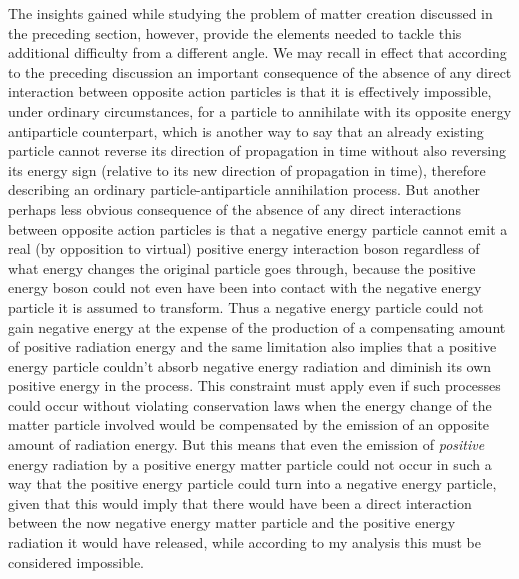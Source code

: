 \documentclass[notitlepage,12pt]{report}
\begin{document}
The insights gained while studying the problem of matter creation discussed in the preceding section, however, provide the elements needed to tackle this additional difficulty from a different angle. We may recall in effect that according to the preceding discussion an important consequence of the absence of any direct interaction between opposite action particles is that it is effectively impossible, under ordinary circumstances, for a particle to annihilate with its opposite energy antiparticle counterpart, which is another way to say that an already existing particle cannot reverse its direction of propagation in time without also reversing its energy sign (relative to its new direction of propagation in time), therefore describing an ordinary particle-antiparticle annihilation process. But another perhaps less obvious consequence of the absence of any direct interactions between opposite action particles is that a negative energy particle cannot emit a real (by opposition to virtual) positive energy interaction boson regardless of what energy changes the original particle goes through, because the positive energy boson could not even have been into contact with the negative energy particle it is assumed to transform. Thus a negative energy particle could not gain negative energy at the expense of the production of a compensating amount of positive radiation energy and the same limitation also implies that a positive energy particle couldn't absorb negative energy radiation and diminish its own positive energy in the process. This constraint must apply even if such processes could occur without violating conservation laws when the energy change of the matter particle involved would be compensated by the emission of an opposite amount of radiation energy. But this means that even the emission of \textit{positive} energy radiation by a positive energy matter particle could not occur in such a way that the positive energy particle could turn into a negative energy particle, given that this would imply that there would have been a direct interaction between the now negative energy matter particle and the positive energy radiation it would have released, while according to my analysis this must be considered impossible.
\end{document}
